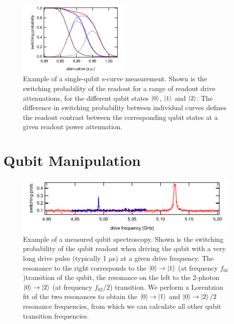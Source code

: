 \begin{figure}
\centering
\includegraphics[width=0.5\textwidth]{"./data/ct5/2011_04_21 - grover and tomo/example - qubit 2 s curves"}
\caption[]{Example of a single-qubit s-curve measurement. Shown is the switching probability of the readout for a range of readout drive attenuations, for the different qubit states $\left| 0 \right>$, $\left| 1 \right>$ and $\left| 2 \right>$. The difference in switching probability between individual curves defines the readout contrast between the corresponding qubit states at a given readout power attenuation.}
\label{fig:qubit_scurves_example}
\end{figure}

\section{Qubit Manipulation}

\begin{figure}[ht!]
\centering
\includegraphics[width=1\textwidth]{"./data/ct5/2011_04_21 - grover and tomo/example - qubit 2 spectroscopy"}
\caption[]{Example of a measured qubit spectroscopy. Shown is the switching probability of the qubit readout when driving the qubit with a very long drive pulse (typically 1 $\mu$s) at a given drive frequency. The resonance to the right corresponds to the $\left| 0 \right>\to\left| 1 \right>$ (at frequency $f_{01}$)transition of the qubit, the resonance on the left to the 2-photon $\left| 0 \right>\to\left| 2 \right>$ (at frequency $f_{02}/2$) transition. We perform a Lorentzian fit of the two resonances to obtain the $\left| 0 \right>\to\left| 1 \right>$ and $\left| 0 \right>\to\left| 2 \right>/2$ resonance frequencies, from which we can calculate all other qubit transition frequencies.}
\label{fig:qubit_spectroscopy_example}
\end{figure}

